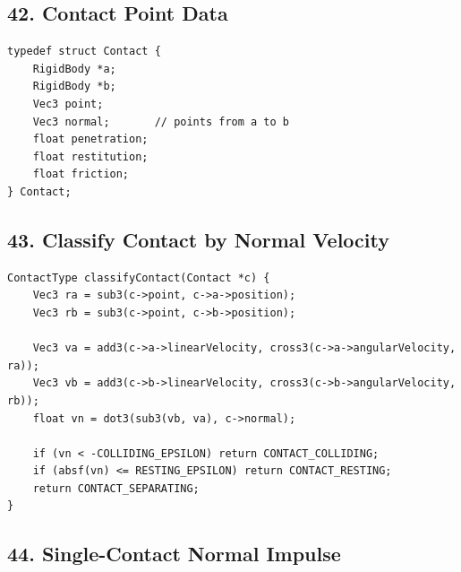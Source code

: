\documentclass[10pt,letterpaper]{article}
\begin{document}
\subsection*{42. Contact Point Data}

\begin{verbatim}
typedef struct Contact {
    RigidBody *a;
    RigidBody *b;
    Vec3 point;
    Vec3 normal;       // points from a to b
    float penetration;
    float restitution;
    float friction;
} Contact;
\end{verbatim}

\subsection*{43. Classify Contact by Normal Velocity}

\begin{verbatim}
ContactType classifyContact(Contact *c) {
    Vec3 ra = sub3(c->point, c->a->position);
    Vec3 rb = sub3(c->point, c->b->position);

    Vec3 va = add3(c->a->linearVelocity, cross3(c->a->angularVelocity, ra));
    Vec3 vb = add3(c->b->linearVelocity, cross3(c->b->angularVelocity, rb));
    float vn = dot3(sub3(vb, va), c->normal);

    if (vn < -COLLIDING_EPSILON) return CONTACT_COLLIDING;
    if (absf(vn) <= RESTING_EPSILON) return CONTACT_RESTING;
    return CONTACT_SEPARATING;
}
\end{verbatim}

\subsection*{44. Single-Contact Normal Impulse}
\end{document}
